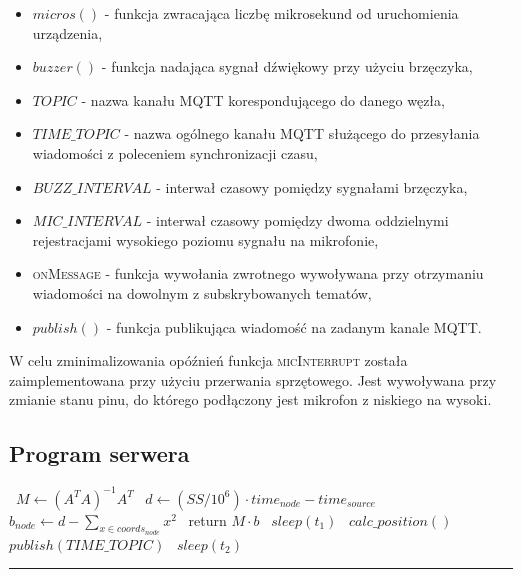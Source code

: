 \begin{itemize}
    \item $micros()$ {-} funkcja zwracająca liczbę mikrosekund od uruchomienia urządzenia,
    \item $buzzer()$ {-} funkcja nadająca sygnał dźwiękowy przy użyciu brzęczyka,
    \item $TOPIC$ {-} nazwa kanału MQTT korespondującego do danego węzła,
    \item $TIME\_TOPIC$ {-} nazwa ogólnego kanału MQTT służącego do przesyłania wiadomości z poleceniem synchronizacji czasu,
    \item $BUZZ\_INTERVAL$ {-} interwał czasowy pomiędzy sygnałami brzęczyka,
    \item $MIC\_INTERVAL$ {-} interwał czasowy pomiędzy dwoma oddzielnymi rejestracjami wysokiego poziomu sygnału na mikrofonie,
    \item \textsc{onMessage} {-} funkcja wywołania zwrotnego wywoływana przy otrzymaniu wiadomości na dowolnym z subskrybowanych tematów,
    \item $publish()$ {-} funkcja publikująca wiadomość na zadanym kanale MQTT.
\end{itemize}

W celu zminimalizowania opóźnień funkcja \textsc{micInterrupt} została zaimplementowana przy użyciu przerwania sprzętowego. Jest wywoływana przy zmianie stanu pinu, do którego podłączony jest mikrofon z niskiego na wysoki.

\subsection{Program serwera}

\begin{center}
    \begin{algorithmic}[1]
        \State\ $M \gets {\left(A^T A\right)}^{-1} A^T$
        \State\ $d \gets (SS / 10^{6}) \cdot time_{node} - time_{source}$
        \State\ $b_{node} \gets d - \sum_{x \in coords_{node}}{x^2}$
        \EndFor
        \State\ return $M \cdot b$
        \EndFunction
        \State\ $sleep(t_1)$
        \State\ $calc\_position()$
        \EndLoop
        \State\ $publish(TIME\_TOPIC)$
        \State\ $sleep(t_2)$
        \EndLoop
    \end{algorithmic}
    \vspace{5pt}
    \hrule
    \label{alg:server}
\end{center}

